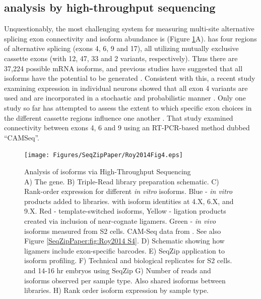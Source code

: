 	\subsection{\dscam{} analysis by high-throughput sequencing}
		\label{SeqZipPaper:subsec:Dscam SeqZip Controls}

		Unquestionably, the most challenging system for measuring multi-site alternative splicing exon connectivity and isoform abundance is \dscam{} (Figure \ref{SeqZipPaper:fig:Roy2014 F4}A). \dscam{} has four regions of alternative splicing (exons 4, 6, 9 and 17), all utilizing mutually exclusive cassette exons (with 12, 47, 33 and 2 variants, respectively). Thus there are 37,224 possible \dscam{} mRNA isoforms, and previous studies have suggested that all isoforms have the potential to be generated \citep{Neves2004,Zhan2004,Sun2013}. Consistent with this, a recent study examining \dscam{} expression in individual neurons showed that all exon 4 variants are used and are incorporated in a stochastic and probabilistic manner \citep{Miura2013b}. Only one study so far has attempted to assess the extent to which specific exon choices in the different cassette regions influence one another \citep{Sun2013}. That study examined connectivity between exons 4, 6 and 9 using an RT-PCR-based method dubbed ``CAMSeq''.

		\begin{figure} %
			\centering 
			\texttt{[image: Figures/SeqZipPaper/Roy2014Fig4.eps]}
			\caption[Analysis of \dscam{} isoforms via High-Throughput Sequencing]
			{ 
				Analysis of \dscam{} isoforms via High-Throughput Sequencing\\[0.25cm]
				A) The \dscam{} gene. B) Triple-Read library preparation schematic. C) Rank-order expression for different \textit{in vitro} \dscam{} isoforms. Blue - \textit{in vitro} products added to libraries. with isoform identities at 4.X, 6.X, and 9.X. Red - template-switched isoforms, Yellow - ligation products created via inclusion of near-cognate ligamers. Green - \textit{in vivo} isoforms measured from S2 cells. CAM-Seq data from \citep{Sun2013}. See also Figure \ref{SeqZipPaper:fig:Roy2014 S4}. D) Schematic showing how ligamers include exon-specific barcodes. E) SeqZip application to \dscam{} isoform profiling. F) Technical and biological replicates for S2 cells. and 14-16 hr embryos using SeqZip G) Number of reads and isoforms observed per sample type. Also shared isoforms between libraries. H) Rank order isoform expression by sample type.
				}
			\label{SeqZipPaper:fig:Roy2014 F4}
			\end{figure}

